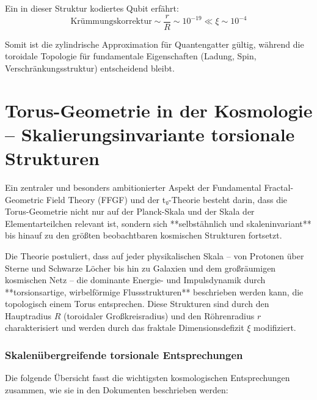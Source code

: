 \documentclass[12pt,a4paper]{article}
\begin{document}
	Ein in dieser Struktur kodiertes Qubit erfährt:
	\[
	\text{Krümmungskorrektur} \sim \frac{r}{R} \sim 10^{-19} 
	\ll \xi \sim 10^{-4}
	\]
	
	Somit ist die zylindrische Approximation für Quantengatter gültig, während die toroidale Topologie für fundamentale Eigenschaften (Ladung, Spin, Verschränkungsstruktur) entscheidend bleibt.
	\section{Torus-Geometrie in der Kosmologie – Skalierungsinvariante torsionale Strukturen}
	
	Ein zentraler und besonders ambitionierter Aspekt der Fundamental Fractal-Geometric Field Theory (FFGF) und der t₀-Theorie besteht darin, dass die Torus-Geometrie nicht nur auf der Planck-Skala und der Skala der Elementarteilchen relevant ist, sondern sich **selbstähnlich und skaleninvariant** bis hinauf zu den größten beobachtbaren kosmischen Strukturen fortsetzt.
	
	Die Theorie postuliert, dass auf jeder physikalischen Skala – von Protonen über Sterne und Schwarze Löcher bis hin zu Galaxien und dem großräumigen kosmischen Netz – die dominante Energie- und Impulsdynamik durch **torsionsartige, wirbelförmige Flussstrukturen** beschrieben werden kann, die topologisch einem Torus entsprechen. Diese Strukturen sind durch den Hauptradius $R$ (toroidaler Großkreisradius) und den Röhrenradius $r$ charakterisiert und werden durch das fraktale Dimensionsdefizit $\xi$ modifiziert.
	
	\subsubsection{Skalenübergreifende torsionale Entsprechungen}
	
	Die folgende Übersicht fasst die wichtigsten kosmologischen Entsprechungen zusammen, wie sie in den Dokumenten beschrieben werden:
	
\end{document}

